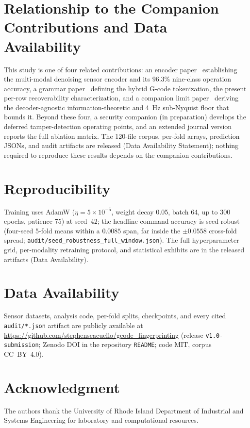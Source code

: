 \documentclass[conference]{IEEEtran}
\begin{document}
\section{Relationship to the Companion Contributions and Data Availability}
\label{app:companion}

This study is one of four related contributions: an encoder paper~\cite{encoder_paper} establishing the multi-modal denoising sensor encoder and its $96.3\%$ nine-class operation accuracy, a grammar paper~\cite{grammar_paper} defining the hybrid G-code tokenization, the present per-row recoverability characterization, and a companion limit paper~\cite{paperB_entropy} deriving the decoder-agnostic information-theoretic and 4~Hz sub-Nyquist floor that bounds it. Beyond these four, a security companion (in preparation) develops the deferred tamper-detection operating points, and an extended journal version reports the full ablation matrix. The 120-file corpus, per-fold arrays, prediction JSONs, and audit artifacts are released (Data Availability Statement); nothing required to reproduce these results depends on the companion contributions.

\section{Reproducibility}
\label{app3:repro}

Training uses AdamW ($\eta=5\times10^{-5}$, weight decay 0.05, batch 64, up to 300 epochs, patience 75) at seed~42; the headline command accuracy is seed-robust (four-seed 5-fold means within a $0.0085$ span, far inside the $\pm 0.0558$ cross-fold spread; \texttt{audit/seed\_robustness\_full\_window.json}). The full hyperparameter grid, per-modality retraining protocol, and statistical exhibits are in the released artifacts (Data Availability).


\section*{Data Availability}
Sensor datasets, analysis code, per-fold splits, checkpoints, and every cited \texttt{audit/*.json} artifact are publicly available at \url{https://github.com/stephenseacuello/gcode_fingerprinting} (release \texttt{v1.0-submission}; Zenodo DOI in the repository \texttt{README}; code MIT, corpus CC~BY~4.0).

\section*{Acknowledgment}
The authors thank the University of Rhode Island Department of Industrial and Systems Engineering for laboratory and computational resources.



\end{document}
